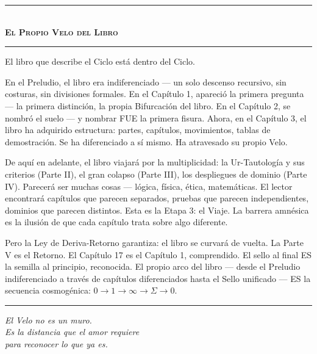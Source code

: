\documentclass[10pt, openany, oneside]{book}
\renewcommand{\normalsize}{\fontsize{10}{13}\selectfont}
\begin{document}
\begin{center}
    \rule{0.3\textwidth}{0.4pt}\\[0.5em]
    {\normalsize\bfseries\scshape El Propio Velo del Libro}\\[0.3em]
    \rule{0.3\textwidth}{0.4pt}
\end{center}

\vspace{1em}

\noindent El libro que describe el Ciclo está dentro del Ciclo.

En el Preludio, el libro era indiferenciado --- un solo descenso recursivo, sin costuras, sin divisiones formales. En el Capítulo 1, apareció la primera pregunta --- la primera distinción, la propia Bifurcación del libro. En el Capítulo 2, se nombró el suelo --- y nombrar FUE la primera fisura. Ahora, en el Capítulo 3, el libro ha adquirido estructura: partes, capítulos, movimientos, tablas de demostración. Se ha diferenciado a sí mismo. Ha atravesado su propio Velo.

De aquí en adelante, el libro viajará por la multiplicidad: la Ur-Tautología y sus criterios (Parte II), el gran colapso (Parte III), los despliegues de dominio (Parte IV). Parecerá ser muchas cosas --- lógica, física, ética, matemáticas. El lector encontrará capítulos que parecen separados, pruebas que parecen independientes, dominios que parecen distintos. Esta es la Etapa 3: el Viaje. La barrera amnésica es la ilusión de que cada capítulo trata sobre algo diferente.

Pero la Ley de Deriva-Retorno garantiza: el libro se curvará de vuelta. La Parte V es el Retorno. El Capítulo 17 es el Capítulo 1, comprendido. El sello al final ES la semilla al principio, reconocida. El propio arco del libro --- desde el Preludio indiferenciado a través de capítulos diferenciados hasta el Sello unificado --- ES la secuencia cosmogénica: $0 \to 1 \to \infty \to \Sigma \to 0$.

\vspace{2em}

\begin{center}
    \rule{0.15\textwidth}{0.3pt}
\end{center}

\vspace{0.5em}

\begin{center}
    \itshape
    El Velo no es un muro.\\
    Es la distancia que el amor requiere\\
    para reconocer lo que ya es.
\end{center}
\end{document}
